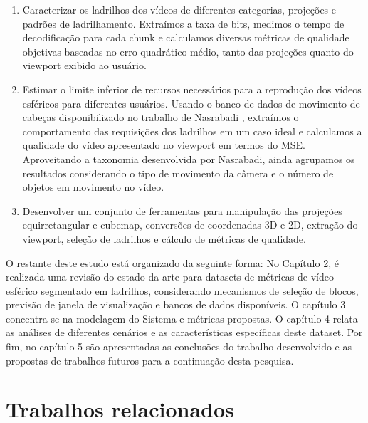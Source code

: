\begin{enumerate}
    \item Caracterizar os ladrilhos dos vídeos de diferentes categorias, projeções e padrões de ladrilhamento. Extraímos a taxa de bits, medimos o tempo de decodificação para cada chunk e calculamos diversas métricas de qualidade objetivas baseadas no erro quadrático médio, tanto das projeções quanto do viewport exibido ao usuário.

    \item Estimar o limite inferior de recursos necessários para a reprodução dos vídeos esféricos para diferentes usuários. Usando o banco de dados de movimento de cabeças disponibilizado no trabalho de Nasrabadi \cite{Nasrabadi2019}, extraímos o comportamento das requisições dos ladrilhos em um caso ideal e calculamos a qualidade do vídeo apresentado no viewport em termos do MSE. Aproveitando a taxonomia desenvolvida por Nasrabadi, ainda agrupamos os resultados considerando o tipo de movimento da câmera e o número de objetos em movimento no vídeo.

    \item Desenvolver um conjunto de ferramentas para manipulação das projeções equirretangular e cubemap, conversões de coordenadas 3D e 2D, extração do viewport, seleção de ladrilhos e cálculo de métricas de qualidade.
\end{enumerate}

O restante deste estudo está organizado da seguinte forma: No Capítulo 2, é realizada uma revisão do estado da arte para datasets de métricas de vídeo esférico segmentado em ladrilhos, considerando mecanismos de seleção de blocos, previsão de janela de visualização e bancos de dados disponíveis. O capítulo 3 concentra-se na modelagem do Sistema e métricas propostas. O capítulo 4 relata as análises de diferentes cenários e as características específicas deste dataset. Por fim, no capítulo 5 são apresentadas as conclusões do trabalho desenvolvido e as propostas de trabalhos futuros para a continuação desta pesquisa.


 \chapter{Trabalhos relacionados}

